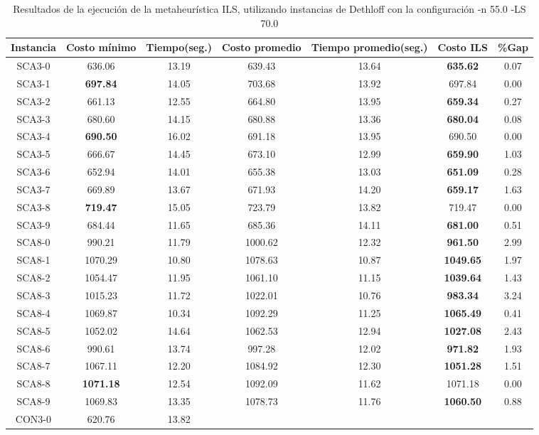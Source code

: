 \begin{table}[ht]
\caption{Resultados de la ejecución de la metaheurística ILS, utilizando instancias de Dethloff con la configuración -n 55.0 -LS 70.0}
\centering
\small
\begin{tabular}{c c c c c c c}
\hline\hline
Instancia & Costo mínimo & Tiempo(seg.) & Costo promedio & Tiempo promedio(seg.) & Costo ILS & \%Gap \\ [0.5ex]
\hline
SCA3-0 & 636.06 & 13.19 & 
639.43 & 13.64 & \bf{635.62} & 
0.07\\SCA3-1 & \bf{697.84} & 14.05 & 
703.68 & 13.92 & 697.84 & 0.00\\
SCA3-2 & 661.13 & 12.55 & 
664.80 & 13.95 & \bf{659.34} & 
0.27\\SCA3-3 & 680.60 & 14.15 & 
680.88 & 13.36 & \bf{680.04} & 
0.08\\SCA3-4 & \bf{690.50} & 16.02 & 
691.18 & 13.95 & 690.50 & 0.00\\
SCA3-5 & 666.67 & 14.45 & 
673.10 & 12.99 & \bf{659.90} & 
1.03\\SCA3-6 & 652.94 & 14.01 & 
655.38 & 13.03 & \bf{651.09} & 
0.28\\SCA3-7 & 669.89 & 13.67 & 
671.93 & 14.20 & \bf{659.17} & 
1.63\\SCA3-8 & \bf{719.47} & 15.05 & 
723.79 & 13.82 & 719.47 & 0.00\\
SCA3-9 & 684.44 & 11.65 & 
685.36 & 14.11 & \bf{681.00} & 
0.51\\SCA8-0 & 990.21 & 11.79 & 
1000.62 & 12.32 & \bf{961.50} & 
2.99\\SCA8-1 & 1070.29 & 10.80 & 
1078.63 & 10.87 & \bf{1049.65} & 
1.97\\SCA8-2 & 1054.47 & 11.95 & 
1061.10 & 11.15 & \bf{1039.64} & 
1.43\\SCA8-3 & 1015.23 & 11.72 & 
1022.01 & 10.76 & \bf{983.34} & 
3.24\\SCA8-4 & 1069.87 & 10.34 & 
1092.29 & 11.25 & \bf{1065.49} & 
0.41\\SCA8-5 & 1052.02 & 14.64 & 
1062.53 & 12.94 & \bf{1027.08} & 
2.43\\SCA8-6 & 990.61 & 13.74 & 
997.28 & 12.02 & \bf{971.82} & 
1.93\\SCA8-7 & 1067.11 & 12.20 & 
1084.92 & 12.30 & \bf{1051.28} & 
1.51\\SCA8-8 & \bf{1071.18} & 12.54 & 
1092.09 & 11.62 & 1071.18 & 0.00\\
SCA8-9 & 1069.83 & 13.35 & 
1078.73 & 11.76 & \bf{1060.50} & 
0.88\\CON3-0 & 620.76 & 13.82 & 

\end{tabular}
\end{table}
